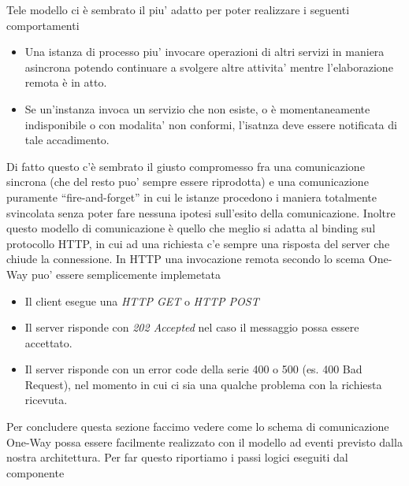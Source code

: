 Tele modello ci \`e sembrato il piu' adatto per poter realizzare i seguenti
comportamenti

\begin{itemize}
  \item Una istanza di processo piu' invocare operazioni di altri servizi in
  maniera asincrona potendo continuare a svolgere altre attivita' mentre
  l'elaborazione remota \`e in atto.
  
  \item Se un'instanza invoca un servizio che non esiste, o \`e momentaneamente
  indisponibile o con modalita' non conformi, l'isatnza deve essere notificata
  di tale accadimento.
\end{itemize}

Di fatto questo c'\`e sembrato il giusto compromesso fra una comunicazione
sincrona (che del resto puo' sempre essere riprodotta) e una comunicazione puramente
``fire-and-forget'' in cui le istanze procedono i maniera totalmente svincolata
senza poter fare nessuna ipotesi sull'esito della comunicazione. Inoltre questo
modello di comunicazione \`e quello che meglio si adatta al binding sul
protocollo HTTP, in cui ad una richiesta c'e sempre una risposta del server che
chiude la connessione. In HTTP una invocazione remota secondo lo scema
One-Way puo' essere semplicemente implemetata

\begin{itemize}
  \item Il client esegue una \emph{HTTP GET} o \emph{HTTP POST}
  \item Il server risponde con \emph{202 Accepted} nel caso il messaggio possa
  essere accettato.
  \item Il server risponde con un error code della serie 400 o 500 (es. 400 Bad
  Request), nel momento in cui ci sia una qualche problema con la richiesta
  ricevuta.
\end{itemize}


Per concludere questa sezione faccimo vedere come lo schema di comunicazione
One-Way possa essere facilmente realizzato con il modello ad eventi previsto
dalla nostra architettura. Per far questo riportiamo i passi logici eseguiti
dal componente 

